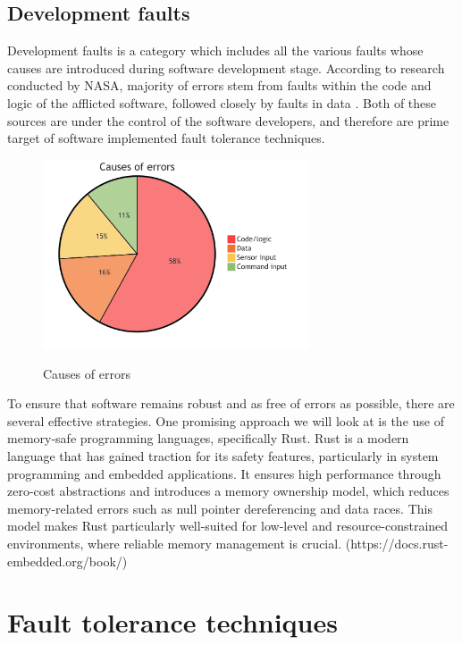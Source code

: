 \documentclass[12pt, letterpaper]{article}
\begin{document}
\subsection{Development faults}

Development faults is a category which includes all the various faults whose causes are introduced during software development stage. According to research conducted by NASA, majority of errors stem from faults within the code and logic of the afflicted software, followed closely by faults in data \cite{nasa:stats}. Both of these sources are under the control of the software developers, and therefore are prime target of software implemented fault tolerance techniques.

\begin{figure}[hbt]
    \centering
    \includegraphics[width=0.7\textwidth]{diagrams/stats/piechart.png}
    \caption{Causes of errors}
    \cite{nasa:stats}
\end{figure}

To ensure that software remains robust and as free of errors as possible, there are several effective strategies. One promising approach we will look at is the use of memory-safe programming languages, specifically Rust. Rust is a modern language that has gained traction for its safety features, particularly in system programming and embedded applications. It ensures high performance through zero-cost abstractions and introduces a memory ownership model, which reduces memory-related errors such as null pointer dereferencing and data races. This model makes Rust particularly well-suited for low-level and resource-constrained environments, where reliable memory management is crucial. (https://docs.rust-embedded.org/book/) \\

\section{Fault tolerance techniques}
\end{document}
